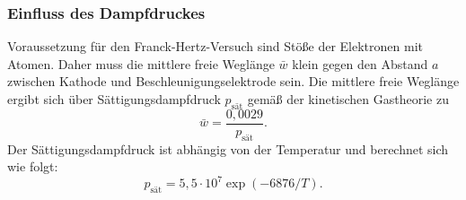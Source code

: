 \subsubsection{Einfluss des Dampfdruckes}
Voraussetzung für den Franck-Hertz-Versuch sind Stöße der Elektronen mit Atomen.
Daher muss die mittlere freie Weglänge $\bar{w}$ klein gegen den Abstand $a$ zwischen Kathode
und Beschleunigungselektrode sein.
Die mittlere freie Weglänge ergibt sich über Sättigungsdampfdruck $p_{\mathrm{sät}}$ gemäß der kinetischen
Gastheorie zu
\begin{equation}
	\label{eqn:freiewegl}
	\bar{w} = \frac{0,0029}{p_{\mathrm{sät}}} \mathrm{.}
\end{equation}
Der Sättigungsdampfdruck ist abhängig von der Temperatur und berechnet sich wie folgt:
\begin{equation}
	\label{eqn:p}
	p_\mathrm{sät}=5,5\cdot10^{7}\exp(-6876/T) \mathrm{.}
\end{equation}
